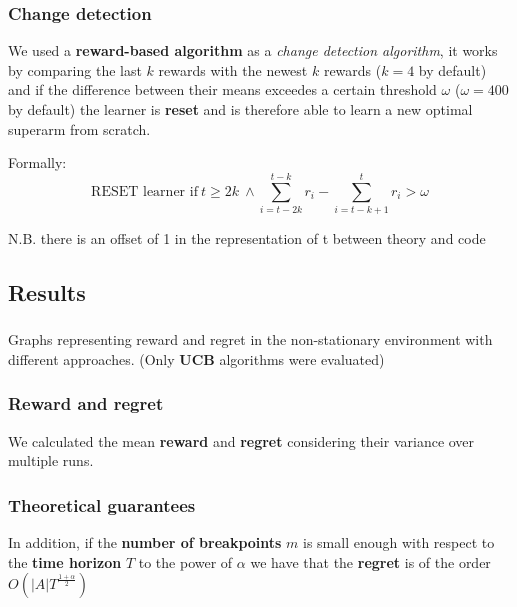 \begin{frame}
\frametitle{Change detection}

We used a \textbf{reward-based algorithm} as a \textit{change detection algorithm}, it works by comparing the last $k$ rewards with the newest $k$ rewards ($k=4$ by default) and if the difference between their means exceedes a certain threshold $\omega$ ($\omega=400$ by default) the learner is \textbf{reset} and is therefore able to learn a new optimal superarm from scratch.

Formally:
\begin{displaymath}
    \text{RESET learner if} ~ t \geq 2k ~ \land \sum_{i=t-2k}^{t-k} r_i -\sum_{i=t-k+1}^t r_i > \omega
\end{displaymath}

\scriptsize N.B. there is an offset of 1 in the representation of t between theory and code

\end{frame}


\subsection{Results}


\begin{frame}
\frametitle{}
\framesubtitle{}


\scriptsize Graphs representing reward and regret in the non-stationary environment with different approaches. (Only \textbf{UCB} algorithms were evaluated)

\end{frame}


\begin{frame}
\frametitle{Reward and regret}

We calculated the mean \textbf{reward} and \textbf{regret} considering their variance over multiple runs.


\end{frame}


\begin{frame}
\frametitle{Theoretical guarantees}

In addition, if the \textbf{number of breakpoints} $m$ is small enough with respect to the \textbf{time horizon} $T$ to the power of $\alpha$ we have that the \textbf{regret} is of the order $O\left( \vert A \vert T^{\frac{1+\alpha}{2}} \right)$

\end{frame}

